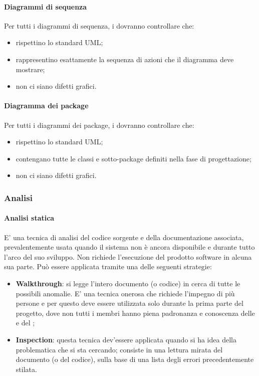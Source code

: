 \paragraph{Diagrammi di sequenza}
Per tutti i diagrammi di sequenza, i \VERP{} dovranno controllare che:
\begin{itemize}
	\item rispettino lo standard UML;
	\item rappresentino esattamente la sequenza di azioni che il diagramma deve mostrare;
	\item non ci siano difetti grafici.
\end{itemize}
\paragraph{Diagramma dei package}
Per tutti i diagrammi dei package, i \VERP{} dovranno controllare che:
\begin{itemize}
	\item rispettino lo standard UML;
	\item contengano tutte le classi e sotto-package definiti nella fase di progettazione;
	\item non ci siano difetti grafici.
\end{itemize}
\subsubsection{Analisi}
\paragraph{Analisi statica}
E' una tecnica di analisi del codice sorgente e della documentazione associata, prevalentemente
usata quando il sistema non è ancora disponibile e durante tutto l'arco del suo sviluppo. Non
richiede l'esecuzione del prodotto software in alcuna sua parte. Può essere applicata tramite una
delle seguenti strategie:
\begin{itemize}
	\item \textbf{Walkthrough}: si legge l'intero documento (o codice) in cerca di tutte le possibili anomalie. E' una tecnica onerosa che richiede l'impegno di più persone e per questo deve essere utilizzata solo durante la prima parte del progetto, dove non tutti i membri hanno piena padronanza e conoscenza delle \NPdoc e del \PQdoc;
	\item \textbf{Inspection}: questa tecnica dev'essere applicata quando si ha idea della
	problematica che si sta cercando; consiste in una lettura mirata del
	documento (o del codice), sulla base di una lista degli errori precedentemente
	stilata.
\end{itemize}
